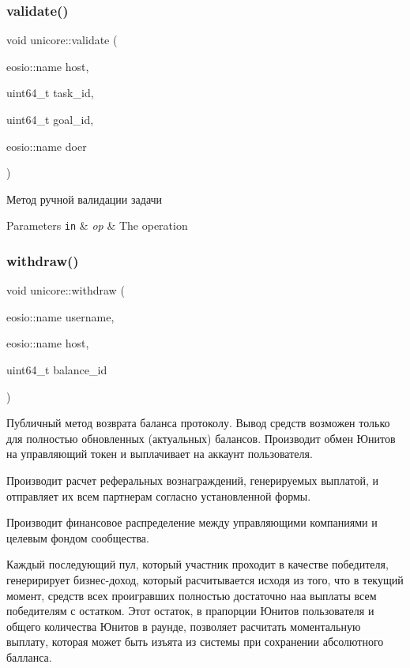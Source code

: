 \subsubsection{\texorpdfstring{validate()}{validate()}}
{\footnotesize\ttfamily void unicore\+::validate (\begin{DoxyParamCaption}\item[{eosio\+::name}]{host,  }\item[{uint64\+\_\+t}]{task\+\_\+id,  }\item[{uint64\+\_\+t}]{goal\+\_\+id,  }\item[{eosio\+::name}]{doer }\end{DoxyParamCaption})}



Метод ручной валидации задачи 


\begin{DoxyParams}[1]{Parameters}
\mbox{\tt in}  & {\em op} & The operation \\
\hline
\end{DoxyParams}
\mbox{\label{classunicore_a25c98e5ea071940b6ab153d71a328a5c}} 
\subsubsection{\texorpdfstring{withdraw()}{withdraw()}}
{\footnotesize\ttfamily void unicore\+::withdraw (\begin{DoxyParamCaption}\item[{eosio\+::name}]{username,  }\item[{eosio\+::name}]{host,  }\item[{uint64\+\_\+t}]{balance\+\_\+id }\end{DoxyParamCaption})}



Публичный метод возврата баланса протоколу. Вывод средств возможен только для полностью обновленных (актуальных) балансов. Производит обмен Юнитов на управляющий токен и выплачивает на аккаунт пользователя. 

Производит расчет реферальных вознаграждений, генерируемых выплатой, и отправляет их всем партнерам согласно установленной формы.

Производит финансовое распределение между управляющими компаниями и целевым фондом сообщества.

Каждый последующий пул, который участник проходит в качестве победителя, генеририрует бизнес-\/доход, который расчитывается исходя из того, что в текущий момент, средств всех проигравших полностью достаточно наа выплаты всем победителям с остатком. Этот остаток, в прапорции Юнитов пользователя и общего количества Юнитов в раунде, позволяет расчитать моментальную выплату, которая может быть изъята из системы при сохранении абсолютного балланса.

